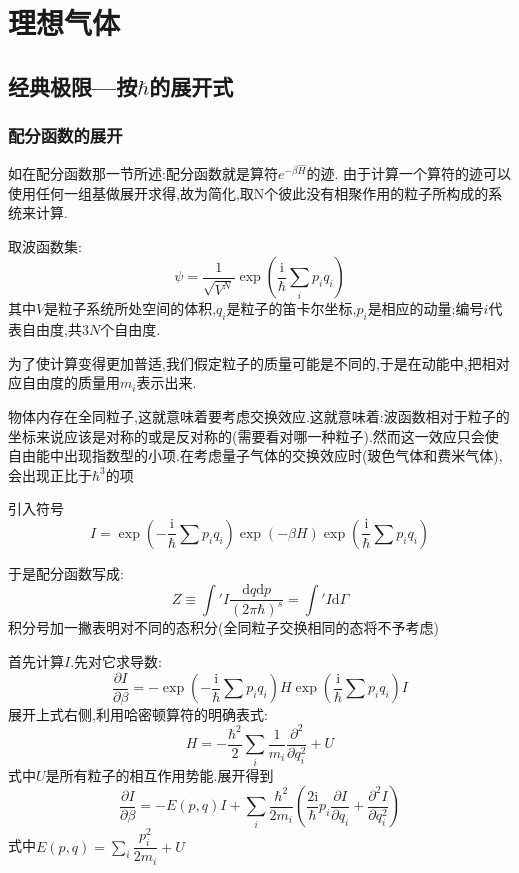 
\section[支线1---理想气体]{理想气体}
\subsection{经典极限---按$\hbar$的展开式}

\subsubsection{配分函数的展开}
如在配分函数那一节所述:配分函数就是算符$e^{-\beta \hat{H}}$的迹. 由于计算一个算符的迹可以使用任何一组基做展开求得,故为简化,取N个彼此没有相聚作用的粒子所构成的系统来计算.

取波函数集:
\[\psi=\frac{1}{\sqrt{V^{N}}}\exp(\frac{\mathrm{i}}{\hbar}\sum_i p_iq_i)\]
其中$V$是粒子系统所处空间的体积,$q_i$是粒子的笛卡尔坐标,$p_i$是相应的动量;编号$i$代表自由度,共$3N$个自由度.

为了使计算变得更加普适,我们假定粒子的质量可能是不同的,于是在动能中,把相对应自由度的质量用$m_i$表示出来.

物体内存在全同粒子,这就意味着要考虑交换效应.这就意味着:波函数相对于粒子的坐标来说应该是对称的或是反对称的(需要看对哪一种粒子).然而这一效应只会使自由能中出现指数型的小项.在考虑量子气体的交换效应时(玻色气体和费米气体),会出现正比于$\hbar^3$的项

\vspace*{0.5cm}

引入符号
\[I=\exp(-\dfrac{\mathrm{i} }{\hbar}\sum p_i q_i)\exp(-\beta H) \exp(\dfrac{\mathrm{i} }{\hbar}\sum p_i q_i)\]

于是配分函数写成:
\begin{equation}
  Z\equiv \int' I \dfrac{\mathrm{d} q\mathrm{d} p}{(2\pi \hbar)^{s}}=\int'I \mathrm{d} \Gamma
\end{equation}
积分号加一撇表明对不同的态积分(全同粒子交换相同的态将不予考虑)

\vspace*{0.5cm}

首先计算$I$.先对它求导数:
\[\dfrac{\partial I}{\partial \beta}=-\exp(-\dfrac{\mathrm{i} }{\hbar}\sum p_i q_i)H\exp(\dfrac{\mathrm{i} }{\hbar}\sum p_i q_i)I\]
展开上式右侧,利用哈密顿算符的明确表式:
\[H=-\dfrac{\hbar^2}{2}\sum_i \frac{1}{m_i}\frac{\partial^2 }{\partial q_i^2}+U\]
式中$U$是所有粒子的相互作用势能.展开得到
\begin{equation}
  \dfrac{\partial I}{\partial \beta}=-E(p,q)I+\sum_i \dfrac{\hbar^{2}}{2m_i}\left( \dfrac{2\mathrm{i} }{\hbar}p_i \dfrac{\partial I}{\partial q_i}+\frac{\partial^2 I}{\partial q_i^2} \right) 
\end{equation}
式中$E(p,q)=\sum_i \dfrac{p_i^{2}}{2m_i}+U$

